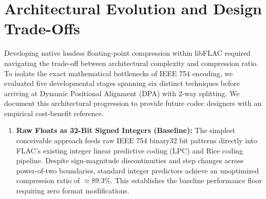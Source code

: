 \documentclass[10pt,twocolumn]{article}
\begin{document}
\section{Architectural Evolution and Design Trade-Offs}

Developing native lossless floating-point compression within libFLAC required navigating the trade-off between architectural complexity and compression ratio. To isolate the exact mathematical bottlenecks of IEEE 754 encoding, we evaluated five developmental stages spanning six distinct techniques before arriving at Dynamic Positional Alignment (DPA) with 2-way splitting. We document this architectural progression to provide future codec designers with an empirical cost-benefit reference.

\begin{enumerate}
	\item \textbf{Raw Floats as 32-Bit Signed Integers (Baseline):} The simplest conceivable approach feeds raw IEEE 754 binary32 bit patterns directly into FLAC's existing integer linear predictive coding (LPC) and Rice coding pipeline. Despite sign-magnitude discontinuities and step changes across power-of-two boundaries, standard integer predictors achieve an unoptimized compression ratio of $\approx 89.3\%$. This establishes the baseline performance floor requiring zero format modifications.


\end{enumerate}
\end{document}
